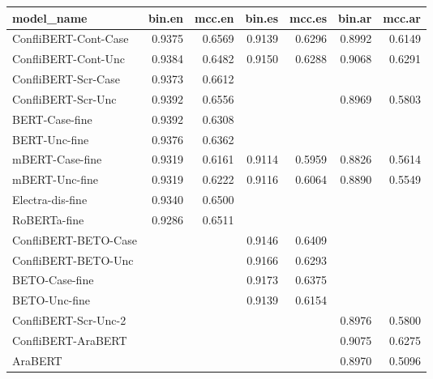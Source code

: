 \begin{table}[ht]
\centering
\begin{tabular}{lrrrrrr}
  \hline
model\_name & bin.en & mcc.en & bin.es & mcc.es & bin.ar & mcc.ar \\ 
  \hline
ConfliBERT-Cont-Case & 0.9375 & 0.6569 & 0.9139 & 0.6296 & 0.8992 & 0.6149 \\ 
ConfliBERT-Cont-Unc & 0.9384 & 0.6482 & 0.9150 & 0.6288 & 0.9068 & 0.6291 \\ 
ConfliBERT-Scr-Case & 0.9373 & 0.6612 &  &  &  &  \\ 
ConfliBERT-Scr-Unc & 0.9392 & 0.6556 &  &  & 0.8969 & 0.5803 \\ 
BERT-Case-fine & 0.9392 & 0.6308 &  &  &  &  \\ 
BERT-Unc-fine & 0.9376 & 0.6362 &  &  &  &  \\ 
mBERT-Case-fine & 0.9319 & 0.6161 & 0.9114 & 0.5959 & 0.8826 & 0.5614 \\ 
mBERT-Unc-fine & 0.9319 & 0.6222 & 0.9116 & 0.6064 & 0.8890 & 0.5549 \\ 
Electra-dis-fine & 0.9340 & 0.6500 &  &  &  &  \\ 
RoBERTa-fine & 0.9286 & 0.6511 &  &  &  &  \\ 
ConfliBERT-BETO-Case &  &  & 0.9146 & 0.6409 &  &  \\ 
ConfliBERT-BETO-Unc &  &  & 0.9166 & 0.6293 &  &  \\ 
BETO-Case-fine &  &  & 0.9173 & 0.6375 &  &  \\ 
BETO-Unc-fine &  &  & 0.9139 & 0.6154 &  &  \\ 
ConfliBERT-Scr-Unc-2 &  &  &  &  & 0.8976 & 0.5800 \\ 
ConfliBERT-AraBERT &  &  &  &  & 0.9075 & 0.6275 \\ 
AraBERT &  &  &  &  & 0.8970 & 0.5096 \\ 
   \hline
\end{tabular}
\end{table}
